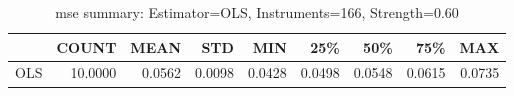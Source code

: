 \begin{table}[ht]
\centering
\caption{mse summary: Estimator=OLS, Instruments=166, Strength=0.60}
\begin{tabular}{lrrrrrrrr}
\toprule
 & COUNT & MEAN & STD & MIN & 25\% & 50\% & 75\% & MAX \\
\midrule
OLS & 10.0000 & 0.0562 & 0.0098 & 0.0428 & 0.0498 & 0.0548 & 0.0615 & 0.0735 \\
\bottomrule
\end{tabular}
\end{table}
